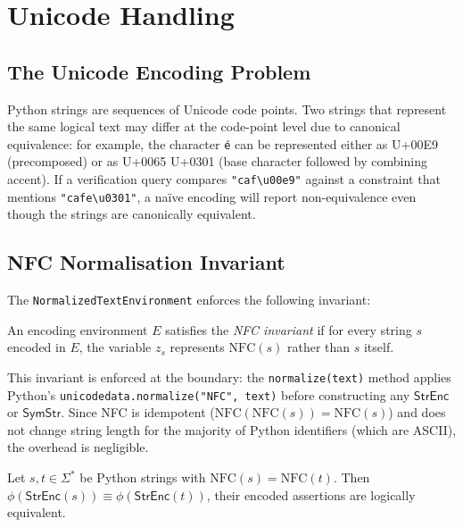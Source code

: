 \documentclass[11pt]{article}
\newcommand{\StrEnc}{\ensuremath{\mathsf{StrEnc}}}
\newcommand{\SymStr}{\ensuremath{\mathsf{SymStr}}}
\newcommand{\NFC}{\ensuremath{\mathrm{NFC}}}
\begin{document}
\section{Unicode Handling}
\label{sec:unicode}

\subsection{The Unicode Encoding Problem}
\label{sec:unicode-problem}

Python strings are sequences of Unicode code points.  Two strings that
represent the same logical text may differ at the code-point level due to
canonical equivalence: for example, the character \texttt{é} can be
represented either as U+00E9 (precomposed) or as U+0065 U+0301 (base character
followed by combining accent).  If a verification query compares
\texttt{"caf\textbackslash{}u00e9"} against a constraint that mentions
\texttt{"cafe\textbackslash{}u0301"}, a na\"ive encoding will report
non-equivalence even though the strings are canonically equivalent.

\subsection{NFC Normalisation Invariant}
\label{sec:nfc}

The \texttt{NormalizedTextEnvironment} enforces the following invariant:

\begin{definition}
\label{def:nfc}
An encoding environment $E$ satisfies the \emph{NFC invariant} if for every
string $s$ encoded in $E$, the variable $z_s$ represents $\NFC(s)$ rather
than $s$ itself.
\end{definition}

This invariant is enforced at the boundary: the \texttt{normalize(text)}
method applies Python's \texttt{unicodedata.normalize("NFC", text)} before
constructing any \StrEnc{} or \SymStr{}.  Since NFC is idempotent
($\NFC(\NFC(s)) = \NFC(s)$) and does not change string length for the
majority of Python identifiers (which are ASCII), the overhead is negligible.

\begin{theorem}
\label{thm:nfc}
Let $s, t \in \Sigma^*$ be Python strings with $\NFC(s) = \NFC(t)$.  Then
$\phi(\StrEnc(s)) \equiv \phi(\StrEnc(t))$, \ie{} their encoded assertions
are logically equivalent.
\end{theorem}
\end{document}
